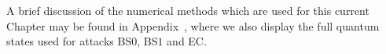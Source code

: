 A brief discussion of the numerical methods which are used for this current Chapter may be found in Appendix~\cite{appendix:crypto_numerical_methods}, where we also display the full quantum states used for attacks BS$0$, BS$1$ and EC.



